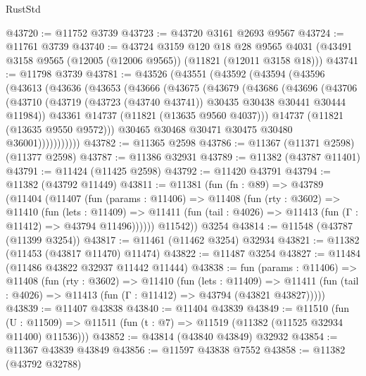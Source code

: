 \begin{lexlean}{RustStd}
\begin{coremodule}
@43720 := @11752 @3739
@43723 := @43720 @3161 @2693 @9567
@43724 := @11761 @3739
@43740 := @43724
    @3159
    @120
    @18
    @28
    @9565
    @4031
    (@43491 @3158 @9565 (@12005 (@12006 @9565)) (@11821 (@12011 @3158 @18)))
@43741 := @11798 @3739
@43781 := @43526
    (@43551
      (@43592
        (@43594
          (@43596
            (@43613
              (@43636
                (@43653
                  (@43666
                    (@43675
                      (@43679
                        (@43686
                          (@43696
                            (@43706
                              (@43710
                                (@43719
                                  (@43723 (@43740 @43741))
                                  @30435
                                  @30438
                                  @30441
                                  @30444
                                  @11984))
                              @43361
                              @14737
                              (@11821 (@13635 @9560 @4037)))
                            @14737
                            (@11821 (@13635 @9550 @9572)))
                          @30465
                          @30468
                          @30471
                          @30475
                          @30480
                          @36001)))))))))))
@43782 := @11365 @2598
@43786 := @11367 (@11371 @2598) (@11377 @2598)
@43787 := @11386 @32931
@43789 := @11382 (@43787 @11401)
@43791 := @11424 (@11425 @2598)
@43792 := @11420 @43791
@43794 := @11382 (@43792 @11449)
@43811 := @11381
    (fun (fn : @89) =>
    @43789
      (@11404
        (@11407
          (fun (params : @11406) =>
          @11408
            (fun (rty : @3602) =>
            @11410
              (fun (lets : @11409) =>
              @11411 (fun (tail : @4026) => @11413 (fun (Γ : @11412) => @43794 @11496))))))
        @11542))
    @3254
@43814 := @11548 (@43787 (@11399 @3254))
@43817 := @11461 (@11462 @3254) @32934
@43821 := @11382 (@11453 (@43817 @11470) @11474)
@43822 := @11487 @3254
@43827 := @11484 (@11486 @43822 @32937 @11442 @11444)
@43838 := fun (params : @11406) =>
  @11408
    (fun (rty : @3602) =>
    @11410
      (fun (lets : @11409) =>
      @11411 (fun (tail : @4026) => @11413 (fun (Γ : @11412) => @43794 (@43821 @43827)))))
@43839 := @11407 @43838
@43840 := @11404 @43839
@43849 := @11510
    (fun (U : @11509) => @11511 (fun (t : @7) => @11519 (@11382 (@11525 @32934 @11400) @11536)))
@43852 := @43814 (@43840 @43849) @32932
@43854 := @11367 @43839 @43849
@43856 := @11597 @43838 @7552
@43858 := @11382 (@43792 @32788)

\end{coremodule}
\end{lexlean}
